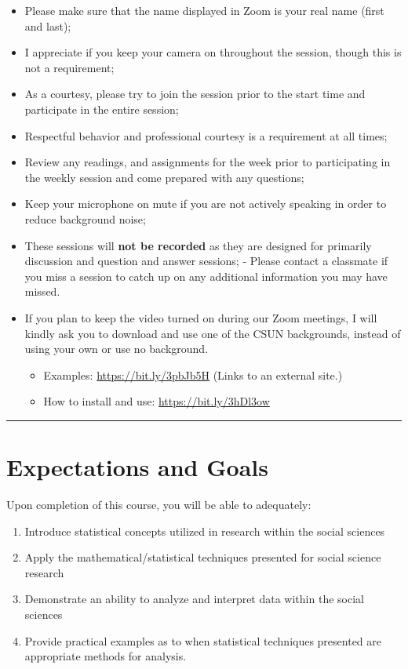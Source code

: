 \documentclass[11pt,]{article}
\providecommand{\tightlist}{%
  \setlength{\itemsep}{0pt}\setlength{\parskip}{0pt}}
\begin{document}
\begin{itemize}
\tightlist
\item
  Please make sure that the name displayed in Zoom is your real name
  (first and last);
\item
  I appreciate if you keep your camera on throughout the session, though
  this is not a requirement;
\item
  As a courtesy, please try to join the session prior to the start time
  and participate in the entire session;
\item
  Respectful behavior and professional courtesy is a requirement at all
  times;
\item
  Review any readings, and assignments for the week prior to
  participating in the weekly session and come prepared with any
  questions;
\item
  Keep your microphone on mute if you are not actively speaking in order
  to reduce background noise;
\item
  These sessions will \textbf{not be recorded} as they are designed for
  primarily discussion and question and answer sessions; - Please
  contact a classmate if you miss a session to catch up on any
  additional information you may have missed.
\item
  If you plan to keep the video turned on during our Zoom meetings, I
  will kindly ask you to download and use one of the CSUN backgrounds,
  instead of using your own or use no background.

  \begin{itemize}
  \tightlist
  \item
    Examples: \url{https://bit.ly/3pbJb5H} (Links to an external site.)
  \item
    How to install and use: \url{https://bit.ly/3hDl3ow}
  \end{itemize}
\end{itemize}

\begin{center}\rule{0.5\linewidth}{0.5pt}\end{center}

\hypertarget{expectations-and-goals}{%
\section{Expectations and Goals}\label{expectations-and-goals}}

Upon completion of this course, you will be able to adequately:

\begin{enumerate}
\def\labelenumi{\arabic{enumi}.}
\tightlist
\item
  Introduce statistical concepts utilized in research within the social
  sciences
\item
  Apply the mathematical/statistical techniques presented for social
  science research
\item
  Demonstrate an ability to analyze and interpret data within the social
  sciences
\item
  Provide practical examples as to when statistical techniques presented
  are appropriate methods for analysis.
\end{enumerate}
\end{document}

